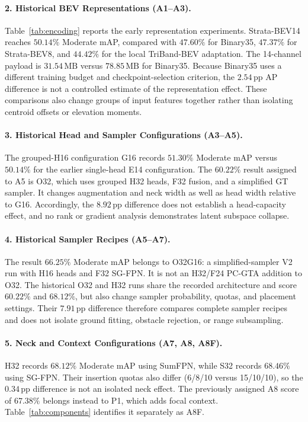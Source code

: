 \paragraph{2. Historical BEV Representations (A1--A3).}

Table~\ref{tab:encoding} reports the early representation experiments. Strata-BEV14 reaches $50.14\%$ Moderate mAP, compared with $47.60\%$ for Binary35, $47.37\%$ for Strata-BEV8, and $44.42\%$ for the local TriBand-BEV adaptation. The 14-channel payload is $31.54\,\text{MB}$ versus $78.85\,\text{MB}$ for Binary35. Because Binary35 uses a different training budget and checkpoint-selection criterion, the $2.54\,\text{pp}$ AP difference is not a controlled estimate of the representation effect. These comparisons also change groups of input features together rather than isolating centroid offsets or elevation moments.

\paragraph{3. Historical Head and Sampler Configurations (A3--A5).}
The grouped-H16 configuration G16 records $51.30\%$ Moderate mAP versus $50.14\%$ for the earlier single-head E14 configuration. The $60.22\%$ result assigned to A5 is O32, which uses grouped H32 heads, F32 fusion, and a simplified GT sampler. It changes augmentation and neck width as well as head width relative to G16. Accordingly, the $8.92\,\text{pp}$ difference does not establish a head-capacity effect, and no rank or gradient analysis demonstrates latent subspace collapse.

\paragraph{4. Historical Sampler Recipes (A5--A7).}
The result $66.25\%$ Moderate mAP belongs to O32G16: a simplified-sampler V2 run with H16 heads and F32 SG-FPN. It is not an H32/F24 PC-GTA addition to O32. The historical O32 and H32 runs share the recorded architecture and score $60.22\%$ and $68.12\%$, but also change sampler probability, quotas, and placement settings. Their $7.91\,\text{pp}$ difference therefore compares complete sampler recipes and does not isolate ground fitting, obstacle rejection, or range subsampling.

\paragraph{5. Neck and Context Configurations (A7, A8, A8F).}
H32 records $68.12\%$ Moderate mAP using SumFPN, while S32 records $68.46\%$ using SG-FPN. Their insertion quotas also differ (6/8/10 versus 15/10/10), so the $0.34\,\text{pp}$ difference is not an isolated neck effect. The previously assigned A8 score of $67.38\%$ belongs instead to P1, which adds focal context. Table~\ref{tab:components} identifies it separately as A8F.

